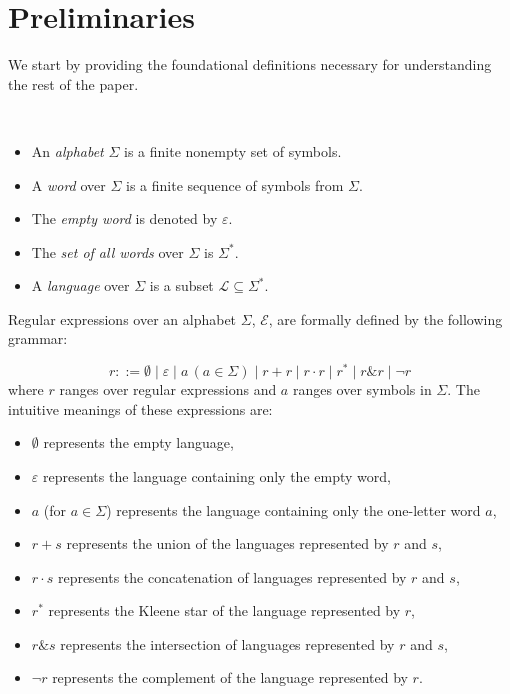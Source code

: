 \section{Preliminaries}\label{sec:preliminaries}

We start by providing the foundational definitions necessary for understanding the rest of the paper.

\begin{definition}
\mbox{}\\[-0.5em]
\begin{itemize}
    \item An \emph{alphabet} $\Sigma$ is a finite nonempty set of symbols.
    \item A \emph{word} over $\Sigma$ is a finite sequence of symbols from $\Sigma$.
    \item The \emph{empty word} is denoted by $\varepsilon$.
    \item The \emph{set of all words} over $\Sigma$ is $\Sigma^*$.
    \item A \emph{language} over $\Sigma$ is a subset $\mathcal{L} \subseteq \Sigma^*$.
\end{itemize}
\end{definition}

\begin{definition}
Regular expressions over an alphabet $\Sigma$, {\color{red} $\mathcal E$}, are formally defined by the following grammar:

$$
r ::= \emptyset \mid \varepsilon \mid a\,(a \in \Sigma) \mid r+r \mid r\cdot r \mid r^* \mid r \& r \mid \neg r
$$
where $r$ ranges over regular expressions and $a$ ranges over symbols in $\Sigma$.
The intuitive meanings of these expressions are:
\begin{itemize}
    \item $\emptyset$ represents the empty language,
    \item $\varepsilon$ represents the language containing only the empty word,
    \item $a$ (for $a \in \Sigma$) represents the language containing only the one-letter word $a$,
    \item $r + s$ represents the union of the languages represented by $r$ and $s$,
    \item $r \cdot s$ represents the concatenation of languages represented by $r$ and $s$,
    \item $r^*$ represents the Kleene star of the language represented by $r$,
    \item $r \& s$ represents the intersection of languages represented by $r$ and $s$,
    \item $\neg r$ represents the complement of the language represented by $r$.
\end{itemize}
\end{definition}


